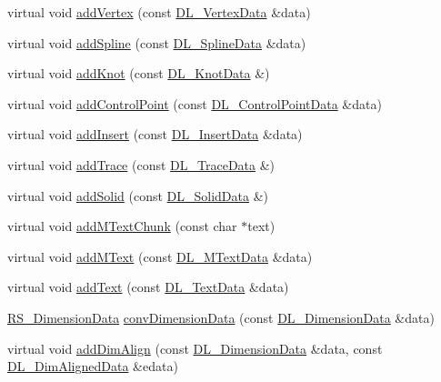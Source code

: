\begin{DoxyCompactItemize}
\item 
virtual void \hyperlink{classRS__FilterJWW_a32375e4693cae0d2c6a6d8644ae9e379}{add\-Vertex} (const \hyperlink{structDL__VertexData}{D\-L\-\_\-\-Vertex\-Data} \&data)
\item 
virtual void \hyperlink{classRS__FilterJWW_a0d2fe6643d1b145d0bfde6fc70c1fe9e}{add\-Spline} (const \hyperlink{structDL__SplineData}{D\-L\-\_\-\-Spline\-Data} \&data)
\item 
virtual void \hyperlink{classRS__FilterJWW_aba5c24457bbc0edcf810667708dfb77e}{add\-Knot} (const \hyperlink{structDL__KnotData}{D\-L\-\_\-\-Knot\-Data} \&)
\item 
virtual void \hyperlink{classRS__FilterJWW_a7cf46032e0c9d0c01f602154101dae26}{add\-Control\-Point} (const \hyperlink{structDL__ControlPointData}{D\-L\-\_\-\-Control\-Point\-Data} \&data)
\item 
virtual void \hyperlink{classRS__FilterJWW_a121db54967741e36aa4668058decde27}{add\-Insert} (const \hyperlink{structDL__InsertData}{D\-L\-\_\-\-Insert\-Data} \&data)
\item 
virtual void \hyperlink{classRS__FilterJWW_a90ed021c6906a01efcb76272a7aa1ddd}{add\-Trace} (const \hyperlink{structDL__TraceData}{D\-L\-\_\-\-Trace\-Data} \&)
\item 
virtual void \hyperlink{classRS__FilterJWW_a2529a4af65d7e2d90a2b754d374a375d}{add\-Solid} (const \hyperlink{structDL__TraceData}{D\-L\-\_\-\-Solid\-Data} \&)
\item 
virtual void \hyperlink{classRS__FilterJWW_ac4e9e5dd53203592f2b3d8bff364a6ef}{add\-M\-Text\-Chunk} (const char $\ast$text)
\item 
virtual void \hyperlink{classRS__FilterJWW_a995b1b06bd66cd1e112850f167f88dd2}{add\-M\-Text} (const \hyperlink{structDL__MTextData}{D\-L\-\_\-\-M\-Text\-Data} \&data)
\item 
virtual void \hyperlink{classRS__FilterJWW_a15ef48852cf090746da76251dbd68827}{add\-Text} (const \hyperlink{structDL__TextData}{D\-L\-\_\-\-Text\-Data} \&data)
\item 
\hyperlink{classRS__DimensionData}{R\-S\-\_\-\-Dimension\-Data} \hyperlink{classRS__FilterJWW_a4d82f34aa2077786cc20802a6d04c55d}{conv\-Dimension\-Data} (const \hyperlink{structDL__DimensionData}{D\-L\-\_\-\-Dimension\-Data} \&data)
\item 
virtual void \hyperlink{classRS__FilterJWW_a3555355bbace31854c4f3cbc839e6255}{add\-Dim\-Align} (const \hyperlink{structDL__DimensionData}{D\-L\-\_\-\-Dimension\-Data} \&data, const \hyperlink{structDL__DimAlignedData}{D\-L\-\_\-\-Dim\-Aligned\-Data} \&edata)

\end{DoxyCompactItemize}
